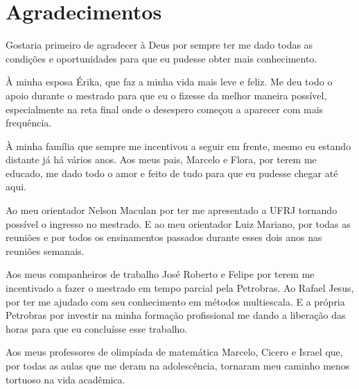 \chapter*{Agradecimentos}

Gostaria primeiro de agradecer à Deus por sempre ter me dado todas as condições e oportunidades para que eu pudesse obter mais conhecimento. 

À minha esposa Érika, que faz a minha vida mais leve e feliz. Me deu todo o apoio durante o mestrado para que eu o fizesse da melhor maneira possível, especialmente na reta final onde o desespero começou a aparecer com mais frequência. 

À minha família que sempre me incentivou a seguir em frente, mesmo eu estando distante já há vários anos. Aos meus pais, Marcelo e Flora, por terem me educado, me dado todo o amor e feito de tudo para que eu pudesse chegar até aqui.

Ao meu orientador Nelson Maculan por ter me apresentado a UFRJ tornando possível o ingresso no mestrado. E ao meu orientador Luiz Mariano, por todas as reuniões e por todos os ensinamentos passados durante esses dois anos nas reuniões semanais. 

Aos meus companheiros de trabalho José Roberto e Felipe por terem me incentivado a fazer o mestrado em tempo parcial pela Petrobras. Ao Rafael Jesus, por ter me ajudado com seu conhecimento em métodos multiescala. E a própria Petrobras por investir na minha formação profissional me dando a liberação das horas para que eu concluísse esse trabalho.

Aos meus professores de olimpíada de matemática Marcelo, Cicero e Israel que, por todas as aulas que me deram na adolescência, tornaram meu caminho menos tortuoso na vida acadêmica.

